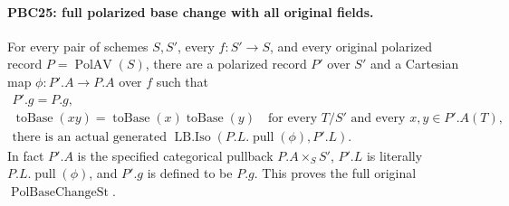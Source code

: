 \paragraph{PBC25: full polarized base change with all original fields.}
\label{claim:PBC25}
For every pair of schemes $S,S'$, every $f:S'\to S$, and
every original polarized record $P=\operatorname{PolAV}(S)$,
there are a polarized record $P'$ over $S'$ and a Cartesian
map $\phi:P'.A\to P.A$ over $f$ such that
\[
 \begin{gathered}
 P'.g=P.g,\\
 \operatorname{toBase}(x y)
       =\operatorname{toBase}(x)\operatorname{toBase}(y)
       \quad\text{for every }T/S'\text{ and every }x,y\in P'.A(T),\\
 \text{there is an actual generated }
       \operatorname{LB.Iso}(P.L.\operatorname{pull}(\phi),P'.L).
 \end{gathered}                                           \tag{PBC.50}
\]
In fact $P'.A$ is the specified categorical pullback
$P.A\times_S S'$, $P'.L$ is literally $P.L.\operatorname{pull}(\phi)$,
and $P'.g$ is defined to be $P.g$.
This proves the full original $\operatorname{PolBaseChangeSt}$.

